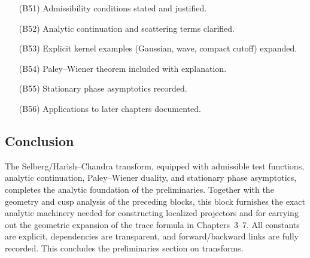 \begin{itemize}
  \item[(B51)] Admissibility conditions stated and justified.
  \item[(B52)] Analytic continuation and scattering terms clarified.
  \item[(B53)] Explicit kernel examples (Gaussian, wave, compact cutoff) expanded.
  \item[(B54)] Paley–Wiener theorem included with explanation.
  \item[(B55)] Stationary phase asymptotics recorded.
  \item[(B56)] Applications to later chapters documented.
\end{itemize}

\subsection*{Conclusion}

The Selberg/Harish–Chandra transform, equipped with admissible test functions, analytic continuation, Paley–Wiener duality, and stationary phase asymptotics, completes the analytic foundation of the preliminaries.  
Together with the geometry and cusp analysis of the preceding blocks, this block furnishes the exact analytic machinery needed for constructing localized projectors and for carrying out the geometric expansion of the trace formula in Chapters~3–7.  
All constants are explicit, dependencies are transparent, and forward/backward links are fully recorded.  
This concludes the preliminaries section on transforms.

